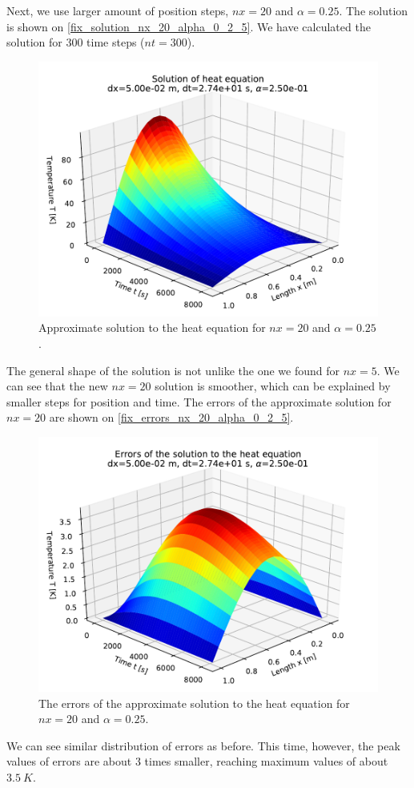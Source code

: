 Next, we use larger amount of position steps, $nx = 20$ and $\alpha = 0.25$. The solution is shown on \autoref{fix_solution_nx_20_alpha_0_2_5}. We have calculated the solution for $300$ time steps ($nt = 300$).
\begin{figure}[H]
  \centering
  \includegraphics[width=1.0\textwidth]{figures/solution_2_50e_01.pdf}
  \caption{Approximate solution to the heat equation for $nx=20$ and $\alpha = 0.25$.}
  \label{fix_solution_nx_20_alpha_0_2_5}
\end{figure}
The general shape of the solution is not unlike the one we found for $nx=5$. We can see that the new $nx=20$ solution is smoother, which can be explained by smaller steps for position and time. The errors of the approximate solution for $nx=20$ are shown on \autoref{fix_errors_nx_20_alpha_0_2_5}.
\begin{figure}[H]
  \centering
  \includegraphics[width=1.0\textwidth]{figures/errors_alpha_2_50e_01.pdf}
  \caption{The errors of the approximate solution to the heat equation for $nx=20$ and $\alpha = 0.25$.}
  \label{fix_errors_nx_20_alpha_0_2_5}
\end{figure}
We can see similar distribution of errors as before. This time, however, the peak values of errors are about $3$ times smaller, reaching maximum values of about $3.5 \ K$.


